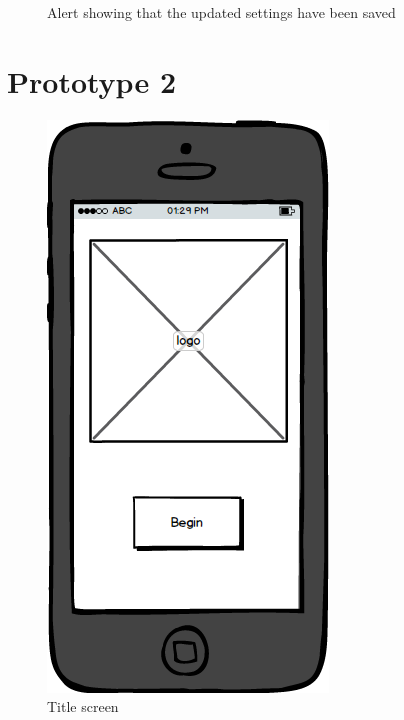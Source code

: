 \documentclass[a4paper]{report}
\begin{document}
{\begin{figure}
\caption{Alert showing that the updated settings have been saved}
\end{figure}
\clearpage

\chapter{Prototype 2}
\begin{figure}
\centering
\includegraphics[scale=0.9]{figures/prototype_2/title}
\caption{Title screen}
\end{figure}
\clearpage
\begin{figure}
\centering

\end{figure}}
\end{document}
